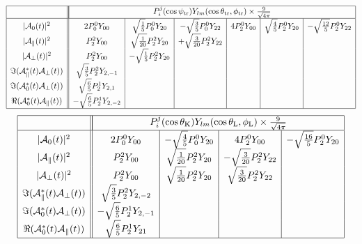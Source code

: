 \documentclass[a4paper,9pt,twoside]{article}
\def\thetatr{\theta_\mathrm{tr}}
\def\phitr{\phi_\mathrm{tr}}
\def\psitr{\psi_\mathrm{tr}}
\def\thetaK{\theta_\mathrm{K}}
\def\thetaL{\theta_\mathrm{L}}
\def\phiL{\phi_\mathrm{L}}
\begin{document}
\begin{equation}
\begin{array}{|c|| c | c | c | c | c | c |}
 \hline
&\multicolumn{6}{|c|}{ P_i^j(\cos\psitr)Y_{lm}(\cos\thetatr,\phitr) \times \frac{9}{\sqrt{4\pi}} } \\
 \hline
|{\cal A}_0(t)|^2                       &  2 P_0^0Y_{00}  & \sqrt{\frac{1}{5}} P_0^0 Y_{20} & -\sqrt{\frac{3}{5}} P_0^0 Y_{22}
                                        &  4 P_2^0Y_{00}  & \sqrt{\frac{4}{5}} P_2^0 Y_{20} & -\sqrt{\frac{12}{5}} P_2^0 Y_{22} \\
|{\cal A}_\parallel(t)|^2               &    P_2^2Y_{00} &  \sqrt{\frac{1}{20}} P_2^2 Y_{20} & +\sqrt{\frac{3}{20}} P_2^2Y_{22} & && \\
|{\cal A}_\perp(t)|^2                   &  P_2^2 Y_{00} & -\sqrt{\frac{1}{5}} P_2^2 Y_{20} &                                 &&& \\
\Im({\cal A}_\parallel^*(t){\cal A}_\perp(t)) &  \sqrt{\frac{3}{5}} P_2^2 Y_{2,-1} &&&&&\\
\Im({\cal A}_0^*(t){\cal A}_\perp(t))         &  \sqrt{\frac{6}{5}} P_2^1 Y_{2,1} &&&&&\\
\Re({\cal A}_0^*(t){\cal A}_\parallel(t))     & -\sqrt{\frac{6}{5}} P_2^1 Y_{2,-2} &&&&&\\
 \hline
\end{array}
\end{equation}
\begin{equation}
\begin{array}{|c|| c | c | c | c | }
 \hline
&\multicolumn{4}{|c|}{ P_i^j(\cos\thetaK)Y_{lm}(\cos\thetaL,\phiL) \times \frac{9}{\sqrt{4\pi}} } \\
 \hline
|{\cal A}_0(t)|^2                       & 2P_0^0Y_{00} & -\sqrt{\frac{4}{5}}P_0^0Y_{20} & 4P_2^0Y_{00} & -\sqrt{\frac{16}{5}} P_2^0Y_{20}  \\
|{\cal A}_\parallel(t)|^2               & P_2^2Y_{00} &\sqrt{\frac{1}{20}} P_2^2Y_{20} &-\sqrt{\frac{3}{20}}P_2^2Y_{22} & \\
|{\cal A}_\perp(t)|^2                   & P_2^2Y_{00} & \sqrt{\frac{1}{20}} P_2^2Y_{20} &\sqrt{\frac{3}{20}}P_2^2Y_{22} & \\
\Im({\cal A}_\parallel^*(t){\cal A}_\perp(t)) & \sqrt{\frac{3}{5}}P_2^2Y_{2,-2}&&&\\
\Im({\cal A}_0^*(t){\cal A}_\perp(t))         & -\sqrt{\frac{6}{5}}P_2^1Y_{2,-1}&&&\\
\Re({\cal A}_0^*(t){\cal A}_\parallel(t))     & \sqrt{\frac{6}{5}}P_2^1Y_{21}&&&\\
 \hline
\end{array}
\end{equation}
\end{document}

